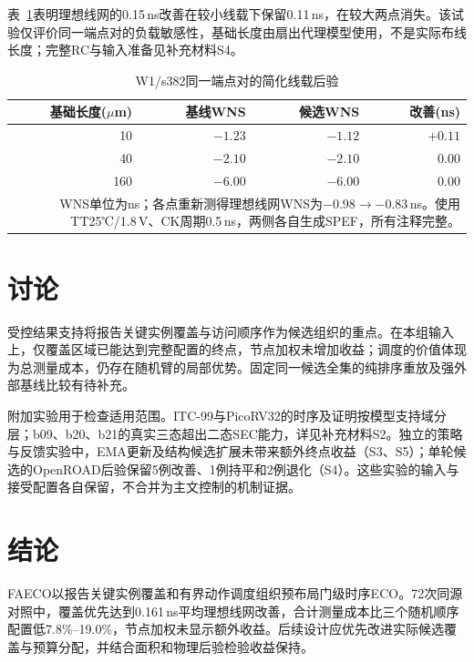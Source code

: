 \documentclass[twocolumn,10pt,fontset=windows]{ctexart}
\begin{document}
表~\ref{tab:load}表明理想线网的0.15\,ns改善在较小线载下保留0.11\,ns，在较大两点消失。该试验仅评价同一端点对的负载敏感性，基础长度由扇出代理模型使用，不是实际布线长度；完整RC与输入准备见补充材料S4。

\begin{table}[htbp]
\centering
\caption{W1/s382同一端点对的简化线载后验}\label{tab:load}
\footnotesize
\setlength{\tabcolsep}{3pt}
\begin{tabular}{rrrr}
\toprule
基础长度($\mu$m) & 基线WNS & 候选WNS & 改善(ns) \\
\midrule
10 & $-1.23$ & $-1.12$ & $+0.11$ \\
40 & $-2.10$ & $-2.10$ & $0.00$ \\
160 & $-6.00$ & $-6.00$ & $0.00$ \\
\bottomrule
\multicolumn{4}{p{0.94\columnwidth}}{\footnotesize WNS单位为ns；各点重新测得理想线网WNS为$-0.98\to-0.83$\,ns。使用TT25℃/1.8\,V、CK周期0.5\,ns，两侧各自生成SPEF，所有注释完整。}\\
\end{tabular}
\end{table}

\section{讨论}

受控结果支持将报告关键实例覆盖与访问顺序作为候选组织的重点。在本组输入上，仅覆盖区域已能达到完整配置的终点，节点加权未增加收益；调度的价值体现为总测量成本，仍存在随机臂的局部优势。固定同一候选全集的纯排序重放及强外部基线比较有待补充。

附加实验用于检查适用范围。ITC-99\cite{itc99}与PicoRV32的时序及证明按模型支持域分层；b09、b20、b21的真实三态超出二态SEC能力，详见补充材料S2。独立的策略与反馈实验中，EMA更新及结构候选扩展未带来额外终点收益（S3、S5）；单轮候选的OpenROAD\cite{openroad}后验保留5例改善、1例持平和2例退化（S4）。这些实验的输入与接受配置各自保留，不合并为主文控制的机制证据。

\section{结论}

FAECO以报告关键实例覆盖和有界动作调度组织预布局门级时序ECO。72次同源对照中，覆盖优先达到0.161\,ns平均理想线网改善，合计测量成本比三个随机顺序配置低7.8\%--19.0\%，节点加权未显示额外收益。后续设计应优先改进实际候选覆盖与预算分配，并结合面积和物理后验检验收益保持。
\end{document}
